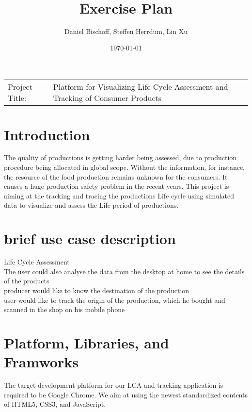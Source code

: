 \documentclass[a4page]{article}
\author{Daniel Bischoff, Steffen Herrdum, Lin Xu}
\title{Exercise Plan}
\date{\today}
\begin{document}
\maketitle

\begin{table}[!th]
\begin{tabular}{l p{}}

Project Title: & Platform for Visualizing Life Cycle Assessment and Tracking of Consumer Products \\

\end{tabular}
\end{table}

\section{Introduction}
The quality of productions is getting harder being assessed, due to production procedure being allocated in global scope. Without the information, for instance, the resource of the food production remains unknown for the consumers. It causes a huge production safety problem in the recent years. This project is aiming at the tracking and tracing the productions Life cycle using simulated data to visualize and assess the Life period of productions. 

\section{brief use case description}
Life Cycle Assessment\\
The user could also analyse the data from the desktop at home to see the details of the products\\
producer would like to know the destination of the production\\
user would like to track the origin of the production, which he bought and scanned in the shop on his mobile phone\\

\section{Platform, Libraries, and Framworks}
The target development platform for our \ac{LCA} and tracking application is required to be Google Chrome. 
We aim at using the newest standardized contents of HTML5, CSS3, and JavaScript.
\end{document}

